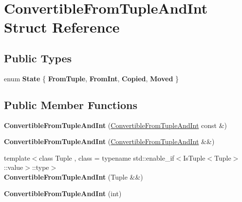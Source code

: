 \hypertarget{struct_convertible_from_tuple_and_int}{}\section{Convertible\+From\+Tuple\+And\+Int Struct Reference}
\label{struct_convertible_from_tuple_and_int}
\subsection*{Public Types}
\begin{DoxyCompactItemize}
\item 
\mbox{\label{struct_convertible_from_tuple_and_int_a6052f9abaf6e85c4109da1c1fd22965f}} 
enum {\bfseries State} \{ {\bfseries From\+Tuple}, 
{\bfseries From\+Int}, 
{\bfseries Copied}, 
{\bfseries Moved}
 \}
\end{DoxyCompactItemize}
\subsection*{Public Member Functions}
\begin{DoxyCompactItemize}
\item 
\mbox{\label{struct_convertible_from_tuple_and_int_abace50434e64307beecae52a1ee26369}} 
{\bfseries Convertible\+From\+Tuple\+And\+Int} (\mbox{\hyperlink{struct_convertible_from_tuple_and_int}{Convertible\+From\+Tuple\+And\+Int}} const \&)
\item 
\mbox{\label{struct_convertible_from_tuple_and_int_a6d0c927a449712f4eece831fc8183061}} 
{\bfseries Convertible\+From\+Tuple\+And\+Int} (\mbox{\hyperlink{struct_convertible_from_tuple_and_int}{Convertible\+From\+Tuple\+And\+Int}} \&\&)
\item 
\mbox{\label{struct_convertible_from_tuple_and_int_ac2b73a1b854e133578b17ed3ab193fea}} 
{\footnotesize template$<$class Tuple , class  = typename std\+::enable\+\_\+if$<$\+Is\+Tuple$<$\+Tuple$>$\+::value$>$\+::type$>$ }\\{\bfseries Convertible\+From\+Tuple\+And\+Int} (Tuple \&\&)
\item 
\mbox{\label{struct_convertible_from_tuple_and_int_a3f2e6138949c80928d88baf0687fb1ac}} 
{\bfseries Convertible\+From\+Tuple\+And\+Int} (int)
\end{DoxyCompactItemize}
